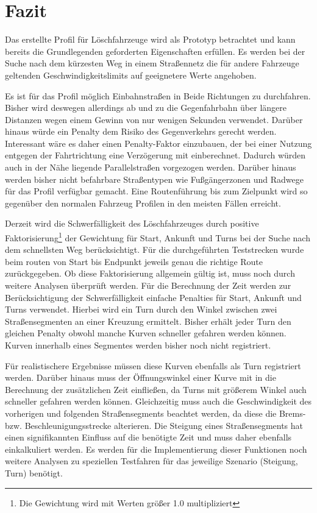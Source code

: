 \section{Fazit}

Das erstellte Profil für Löschfahrzeuge wird als Prototyp betrachtet und kann bereits die Grundlegenden geforderten Eigenschaften erfüllen.
Es werden bei der Suche nach dem kürzesten Weg in einem Straßennetz die für andere Fahrzeuge geltenden Geschwindigkeitslimits auf geeignetere Werte angehoben.

Es ist für das Profil möglich Einbahnstraßen in Beide Richtungen zu durchfahren.
Bisher wird deswegen allerdings ab und zu die Gegenfahrbahn über längere Distanzen wegen einem Gewinn von nur wenigen Sekunden verwendet.
Darüber hinaus würde ein Penalty dem Risiko des Gegenverkehrs gerecht werden.
Interessant wäre es daher einen Penalty-Faktor einzubauen, der bei einer Nutzung entgegen der Fahrtrichtung eine Verzögerung mit einberechnet.
Dadurch würden auch in der Nähe liegende Parallelstraßen vorgezogen werden.
Darüber hinaus werden bisher nicht befahrbare Straßentypen wie Fußgängerzonen und Radwege für das Profil verfügbar gemacht.
Eine Routenführung bis zum Zielpunkt wird so gegenüber den normalen Fahrzeug Profilen in den meisten Fällen erreicht.

Derzeit wird die Schwerfälligkeit des Löschfahrzeuges durch positive Faktorisierung\footnote{Die Gewichtung wird mit Werten größer 1.0 multipliziert} der Gewichtung für Start, Ankunft und Turns bei der Suche nach dem schnellsten Weg berücksichtigt.
Für die durchgeführten Teststrecken wurde beim routen von Start bis Endpunkt jeweils genau die richtige Route zurückgegeben.
Ob diese Faktorisierung allgemein gültig ist, muss noch durch weitere Analysen überprüft werden.
Für die Berechnung der Zeit werden zur Berücksichtigung der Schwerfälligkeit einfache Penalties für Start, Ankunft und Turns verwendet.
Hierbei wird ein Turn durch den Winkel zwischen zwei Straßensegmenten an einer Kreuzung ermittelt.
Bisher erhält jeder Turn den gleichen Penalty obwohl manche Kurven schneller gefahren werden können.
Kurven innerhalb eines Segmentes werden bisher noch nicht registriert.

Für realistischere Ergebnisse müssen diese Kurven ebenfalls als Turn registriert werden.
Darüber hinaus muss der Öffnungswinkel einer Kurve mit in die Berechnung der zusätzlichen Zeit einfließen, da Turns mit größerem Winkel auch schneller gefahren werden können.
Gleichzeitig muss auch die Geschwindigkeit des vorherigen und folgenden Straßensegments beachtet werden, da diese die Brems- bzw. Beschleunigungsstrecke alterieren.
Die Steigung eines Straßensegments hat einen signifikannten Einfluss auf die benötigte Zeit und muss daher ebenfalls einkalkuliert werden.
Es werden für die Implementierung dieser Funktionen noch weitere Analysen zu speziellen Testfahren für das jeweilige Szenario (Steigung, Turn) benötigt.

